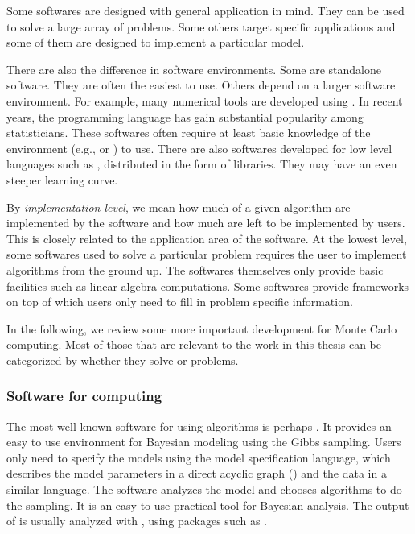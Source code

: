 Some softwares are designed with general application in mind. They can be used to solve a large array of problems. Some others target specific applications and some of them are designed to implement a particular model.

There are also the difference in software environments. Some are standalone software. They are often the easiest to use. Others depend on a larger software environment. For example, many numerical tools are developed using \matlab \cite{matlab}. In recent years, the \rlang programming language \cite{rlang} has gain substantial popularity among statisticians. These softwares often require at least basic knowledge of the environment (e.g., \matlab or \rlang) to use. There are also softwares developed for low level languages such as \cpp, distributed in the form of libraries. They may have an even steeper learning curve.

By \emph{implementation level}, we mean how much of a given algorithm are implemented by the software and how much are left to be implemented by users. This is closely related to the application area of the software. At the lowest level, some softwares used to solve a particular problem requires the user to implement algorithms from the ground up. The softwares themselves only provide basic facilities such as linear algebra computations. Some softwares provide frameworks on top of which users only need to fill in problem specific information.

In the following, we review some more important development for Monte Carlo computing. Most of those that are relevant to the work in this thesis can be categorized by whether they solve \mcmc or \smc problems.

\subsubsection{Software for \protect\mcmc computing}
\label{ssub:Softwares for mcmc computing}

The most well known software for using \mcmc algorithms is perhaps \bugs \cite{bugs, bugsbook}. It provides an easy to use environment for Bayesian modeling using the Gibbs sampling. Users only need to specify the models using the \bugs model specification language, which describes the model parameters in a direct acyclic graph (\dag) and the data in a similar language. The software analyzes the model and chooses \mcmc algorithms to do the sampling. It is an easy to use practical tool for Bayesian analysis. The output of \bugs is usually analyzed with \rlang, using packages such as \rcoda \cite{rcoda}.

